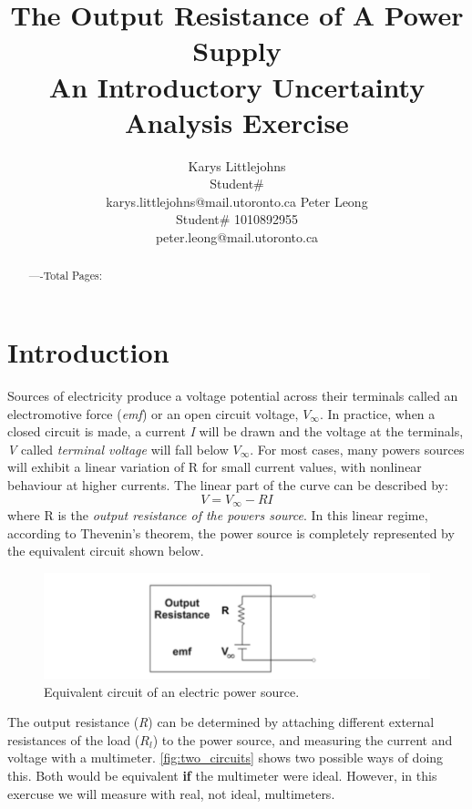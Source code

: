 \documentclass{article} %
\title{The Output Resistance of A Power Supply \\
An Introductory Uncertainty Analysis Exercise}
\author{Karys Littlejohns\\
Student\# \\
karys.littlejohns@mail.utoronto.ca
\And
Peter Leong \\
Student\# 1010892955 \\
peter.leong@mail.utoronto.ca \\
\AND
}
\begin{document}
\maketitle

\vspace{-6ex}

\begin{abstract}

----Total Pages: \pageref{last_page}
\end{abstract}

\vspace{2ex}

\section{Introduction}

Sources of electricity produce a voltage potential across their terminals called an electromotive force (\textit{emf}) or an open circuit voltage, $V_{\infty}$.
In practice, when a closed circuit is made, a current \textit{I} will be drawn and the voltage at the terminals, \textit{V} called \textit{terminal voltage} will fall below $V_{\infty}$.
For most cases, many powers sources will exhibit a linear variation of R for small current values, with nonlinear behaviour at higher currents.
The linear part of the curve can be described by:
\[
V = V_{\infty} - RI
\]
where R is the \textit{output resistance of the powers source}.
In this linear regime, according to Thevenin's theorem, the power source is completely represented by the equivalent circuit shown below.

\begin{figure}[htbp]            %
  \centering
  \includegraphics[width=0.65\linewidth]{Figs/power_source.png}
  \caption{Equivalent circuit of an electric power source.}
  \label{fig:power_source}
\end{figure}

The output resistance (\textit{R}) can be determined by attaching different external resistances of the load ($R_{l}$) to the power source, and measuring the current and voltage with a multimeter.
\ref{fig:two_circuits} shows two possible ways of doing this. Both would be equivalent \textbf{if} the multimeter were ideal.
However, in this exercuse we will measure with real, not ideal, multimeters.
\end{document}

